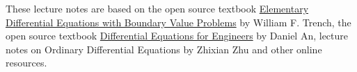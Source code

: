 
\clearpage
\thispagestyle{empty}

These lecture notes are based on the open source textbook \href{https://digitalcommons.trinity.edu/mono/9/}{Elementary Differential Equations with Boundary Value Problems}
by William F. Trench, the open source textbook \href{https://github.com/otlmath/DE_for_Engineers}{Differential Equations for Engineers} by Daniel An, lecture notes on Ordinary Differential Equations by Zhixian Zhu and other online resources.

\newpage

